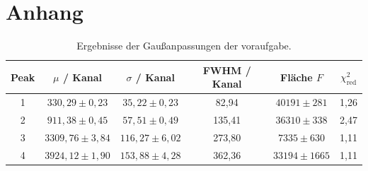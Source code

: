 \chapter{Anhang}

\begin{table}[H]
\centering
\caption{Ergebnisse der Gaußanpassungen der voraufgabe.}
\label{tab:peak_fits}
\begin{tabular}{cccccc}
\toprule
Peak & $\mu$ / Kanal & $\sigma$ / Kanal & FWHM / Kanal & Fläche $F$ & $\chi^2_\mathrm{red}$ \\
\midrule
1 & $330,29 \pm 0,23$   & $35,22 \pm 0,23$   & 82,94  & $40191 \pm 281$   & 1,26 \\
2 & $911,38 \pm 0,45$   & $57,51 \pm 0,49$   & 135,41 & $36310 \pm 338$   & 2,47 \\
3 & $3309,76 \pm 3,84$  & $116,27 \pm 6,02$  & 273,80 & $7335 \pm 630$    & 1,11 \\
4 & $3924,12 \pm 1,90$  & $153,88 \pm 4,28$  & 362,36 & $33194 \pm 1665$  & 1,11 \\
\bottomrule
\end{tabular}
\end{table}

